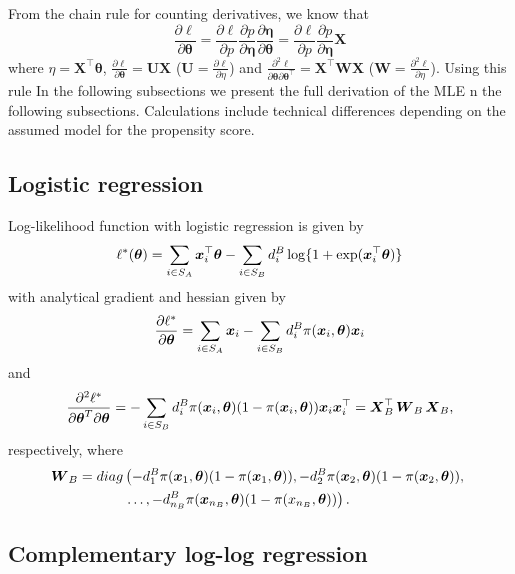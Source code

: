 \documentclass[
  letterpaper,
  DIV=11,
  numbers=noendperiod]{scrreprt}
\begin{document}
From the chain rule for counting derivatives, we know that \[
\begin{equation*}
    \frac{\partial \ell}{\partial \boldsymbol{\theta}}=\frac{\partial \ell}{\partial p} \frac{\partial p}{\partial \boldsymbol{\eta}} \frac{\partial \boldsymbol{\eta}}{\partial \boldsymbol{\theta}}=\frac{\partial \ell}{\partial p} \frac{\partial p}{\partial \boldsymbol{\eta}} \boldsymbol{X}
\end{equation*}
\] where \(\eta=\boldsymbol{X}^{\top} \boldsymbol{\theta}\),
\(\frac{\partial \ell}{\partial \boldsymbol{\theta}}=\boldsymbol{U} \boldsymbol{X}\)
(\(\boldsymbol{U} = \frac{\partial \ell}{\partial {\eta}}\)) and
\(\frac{\partial^2 \ell}{\partial \boldsymbol{\theta} \partial \boldsymbol{\theta}^{\top}}= \boldsymbol{X}^{\top} \boldsymbol{W} \boldsymbol{X}\)
(\(\boldsymbol{W} = \frac{\partial^2 \ell}{\partial {\eta}}\)). Using
this rule In the following subsections we present the full derivation of
the MLE n the following subsections. Calculations include technical
differences depending on the assumed model for the propensity score.

\hypertarget{logistic-regression}{%
\subsection{Logistic regression}\label{logistic-regression}}

Log-likelihood function with logistic regression is given by \[
\ell^{*}(\boldsymbol{\theta}) = \sum_{i \in S_A}\boldsymbol{x}_{i}^{\top}\boldsymbol{\theta} - \sum_{i \in S_B}d_{i}^{B}\log\{1 + \exp(\boldsymbol{x}_{i}^{\top}\boldsymbol{\theta})\}
\] with analytical gradient and hessian given by \[
\frac{\partial \ell^*}{\partial\boldsymbol{\theta}} = \sum_{i \in S_{A}}\boldsymbol{x}_{i} - \sum_{i \in S_{B}}d_{i}^{B}\pi(\boldsymbol{x}_{i}, \boldsymbol{\theta})\boldsymbol{x}_{i}
\] and \[
    \frac{\partial^{2} \ell^{*}}{\partial\boldsymbol{\theta}^{T} \partial\boldsymbol{\theta}} =- \sum_{i \in S_B}d_i^B\pi(\boldsymbol{x}_i,\boldsymbol{\theta})(1 - \pi(\boldsymbol{x}_i,\boldsymbol{\theta}))\boldsymbol{x}_i\boldsymbol{x}_i^{\top} = \boldsymbol{X}_B^{\top}\operatorname{\boldsymbol{W}}_{B}\boldsymbol{X}_B,
\] respectively, where \[
\begin{align*}
    \operatorname{\boldsymbol{W}}_{B} =
    diag & \left(-d_1^B\pi(\boldsymbol{x}_{1},\boldsymbol{\theta})(1 - \pi(\boldsymbol{x}_{1},\boldsymbol{\theta})), -d_2^B\pi(\boldsymbol{x}_{2},\boldsymbol{\theta})(1 - \pi(\boldsymbol{x}_{2},\boldsymbol{\theta})), \right. \\
     & \left. \ldots, -d_{n_{B}}^{B}\pi(\boldsymbol{x}_{n_{B}},\boldsymbol{\theta})(1 - \pi(x_{n_{B}},\boldsymbol{\theta}))\right).
\end{align*}
\]

\hypertarget{complementary-log-log-regression}{%
\subsection{Complementary log-log
regression}\label{complementary-log-log-regression}}
\end{document}
